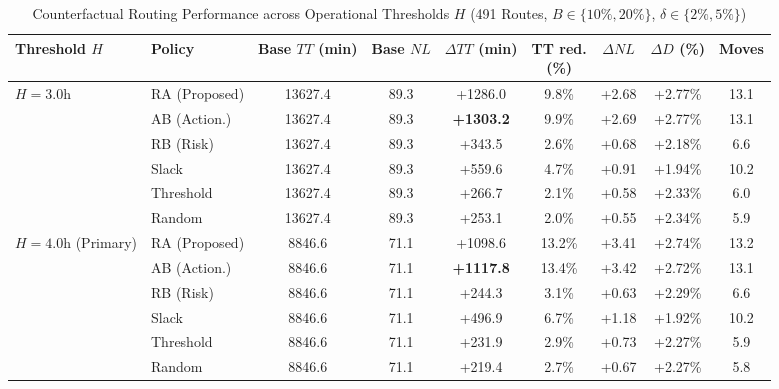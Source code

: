 \documentclass[11pt,a4paper]{article}
\begin{document}
\begin{table}[htbp]
\centering
\caption{Counterfactual Routing Performance across Operational Thresholds $H$ (491 Routes, $B \in \{10\%, 20\%\}$, $\delta \in \{2\%, 5\%\}$)}
\label{tab:threshold-sensitivity-results}
\scriptsize
\setlength{\tabcolsep}{2pt}
\renewcommand{\arraystretch}{1.12}
\begin{tabular}{llccccccc}
\toprule
\shortstack{\textbf{Threshold}\\\textbf{$H$}} & \textbf{Policy} & \shortstack{\textbf{Base $TT$}\\\textbf{(min)}} & \shortstack{\textbf{Base}\\\textbf{$NL$}} & \shortstack{\textbf{$\Delta TT$}\\\textbf{(min)}} & \shortstack{\textbf{TT red.}\\\textbf{(\%)}} & \textbf{$\Delta NL$} & \shortstack{\textbf{$\Delta D$}\\\textbf{(\%)}} & \textbf{Moves} \\
\midrule
$H = 3.0$h & RA (Proposed) & 13627.4 & 89.3 & +1286.0 & 9.8\% & +2.68 & +2.77\% & 13.1 \\
           & AB (Action.)  & 13627.4 & 89.3 & \textbf{+1303.2} & 9.9\% & +2.69 & +2.77\% & 13.1 \\
           & RB (Risk)     & 13627.4 & 89.3 & +343.5  & 2.6\% & +0.68 & +2.18\% & 6.6 \\
           & Slack         & 13627.4 & 89.3 & +559.6  & 4.7\% & +0.91 & +1.94\% & 10.2 \\
           & Threshold     & 13627.4 & 89.3 & +266.7  & 2.1\% & +0.58 & +2.33\% & 6.0 \\
           & Random        & 13627.4 & 89.3 & +253.1  & 2.0\% & +0.55 & +2.34\% & 5.9 \\
\midrule
\shortstack{$H = 4.0$h\\(Primary)} & RA (Proposed) & 8846.6 & 71.1 & +1098.6 & 13.2\% & +3.41 & +2.74\% & 13.2 \\
           & AB (Action.)  & 8846.6 & 71.1 & \textbf{+1117.8} & 13.4\% & +3.42 & +2.72\% & 13.1 \\
           & RB (Risk)     & 8846.6 & 71.1 & +244.3  & 3.1\% & +0.63 & +2.29\% & 6.6 \\
           & Slack         & 8846.6 & 71.1 & +496.9  & 6.7\% & +1.18 & +1.92\% & 10.2 \\
           & Threshold     & 8846.6 & 71.1 & +231.9  & 2.9\% & +0.73 & +2.27\% & 5.9 \\
           & Random        & 8846.6 & 71.1 & +219.4  & 2.7\% & +0.67 & +2.27\% & 5.8 \\

\end{tabular}
\end{table}
\end{document}

